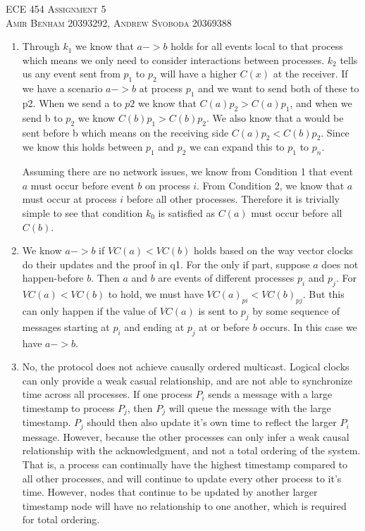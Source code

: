 \documentclass{article}
\begin{document}
\begin{center}
\textsc{\Large ECE 454 Assignment 5}\\[0.5cm]
\textsc{Amir Benham 20393292, Andrew Svoboda 20369388}\\[0.5cm]
\end{center}

\begin{enumerate}

	\item  

Through \(k_1\) we know that  \(a -> b\) holds for all events local to that process which means we only need to consider interactions between processes. \(k_2\) tells us any event sent from \(p_1\) to \(p_2\) will have a higher \(C(x)\) at the receiver. If we have a scenario \(a -> b\) at process \(p_1\) and we want to send both of these to p2. When we send a to \(p2\) we know that \(C(a) p_2 > C(a) p_1\), and when we send b to \(p_2\) we know \(C(b) p_1 > C(b) p_2\).  We also know that a would be sent before b which means on the receiving side \(C(a) p_2 < C(b) p_2\). Since we know this holds between \(p_1\) and \(p_2\) we can expand this to \(p_1\) to \(p_n\).

Assuming there are no network issues, we know from Condition 1 that event \(a\) must occur before event \(b\) on process \(i\). From Condition 2, we know that \(a\) must occur at process \(i\) before all other processes. Therefore it is trivially simple to see that condition \(k_0\) is satisfied as \(C(a)\) must occur before all \(C(b)\).

	\item
	
We know \(a ->b \) if \( VC(a) <VC(b)\) holds based on the way vector clocks do their updates and the proof in q1.  For the only if part, suppose \(a\) does not happen-before \(b\). Then \(a\) and \(b\) are events of different processes \(p_i\) and \(p_j\). For \(VC(a) < VC(b)\) to hold, we must have \(VC(a)_{pi} < VC(b)_{pj}\). But this can only happen if the value of \(VC(a)\) is sent to \(p_j\) by some sequence of messages starting at \(p_i\) and ending at \(p_j\) at or before \(b\) occurs. In this case we have \(a -> b\).

	\item

No, the protocol does not achieve causally ordered multicast. Logical clocks can only provide a weak casual relationship, and are not able to synchronize time across all processes. If one process \(P_i\) sends a message with a large timestamp to process \(P_j\), then \(P_j\) will queue the message with the large timestamp. \(P_j\) should then also update it's own time to reflect the larger \(P_i\) message. However, because the other processes can only infer a weak causal relationship with the acknowledgment, and not a total ordering of the system. That is, a process can continually have the highest timestamp compared to all other processes, and will continue to update every other process to it's time. However, nodes that continue to be updated by another larger timestamp node will have no relationship to one another, which is required for total ordering.


\end{enumerate}
\end{document}

